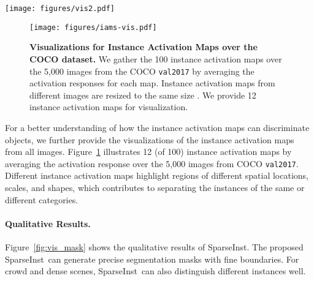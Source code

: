 \documentclass[10pt,twocolumn,letterpaper]{article}
\newcommand{\name}{SparseInst}
\begin{document}
\begin{figure*}[htbp]
    \centering
    \texttt{[image: figures/vis2.pdf]}
    \vspace{-5pt}
    \caption{\textbf{Visualizations for Instance Segmentation.} The results are obtained by \name{} on COCO \texttt{val2017}. The confidence threshold is set to 0.4. We can observe that \name~can generate precise boundaries, highlight and segment well on the crowd scenes, and cope with the scale-variant segmentation.}
    \vspace{-5pt}
    \label{fig:vis_mask}
\end{figure*}


\begin{figure}[]
\centering
\texttt{[image: figures/iams-vis.pdf]}
\caption{\textbf{Visualizations for Instance Activation Maps over the COCO dataset.} We gather the 100 instance activation maps over the 5,000 images from the COCO \texttt{val2017} by averaging the activation responses for each map. Instance activation maps from different images are resized to the same size . We provide 12 instance activation maps for visualization.}
\label{fig:vis_iam_all}
\vspace{-10pt}
\end{figure}

For a better understanding of how the instance activation maps can discriminate objects, we further provide the visualizations of the instance activation maps from all images. Figure~\ref{fig:vis_iam_all} illustrates 12 (of 100) instance activation maps by averaging the activation response over the 5,000 images from COCO \texttt{val2017}. Different instance activation maps highlight regions of different spatial locations, scales, and shapes, which contributes to separating the instances of the same or different categories.
\paragraph{Qualitative Results.}
Figure~\ref{fig:vis_mask} shows the qualitative results of \name. The proposed \name~can generate precise segmentation masks with fine boundaries. For crowd and dense scenes, \name~can also distinguish different instances well.
\end{document}
